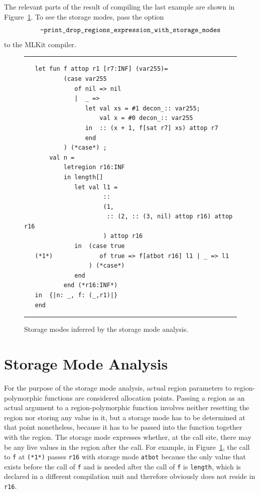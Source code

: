 \documentclass[12pt]{book}
\begin{document}
The relevant parts of the result of compiling the last example are
shown in Figure~\ref{sma1.fig}.  To see the storage modes, pass the option
%
$$\hbox{\tt -print\_drop\_regions\_expression\_with\_storage\_modes}$$
to the MLKit compiler.


\begin{figure}
\hrule 
\medskip
\begin{verbatim}
   let fun f attop r1 [r7:INF] (var255)= 
           (case var255 
              of nil => nil
              |  _ => 
                 let val xs = #1 decon_:: var255; 
                     val x = #0 decon_:: var255
                 in  :: (x + 1, f[sat r7] xs) attop r7
                 end 
           ) (*case*) ; 
       val n = 
           letregion r16:INF 
           in length[] 
              let val l1 = 
                      :: 
                      (1, 
                       :: (2, :: (3, nil) attop r16) attop r16
                      ) attop r16
              in  (case true 
   (*1*)             of true => f[atbot r16] l1 | _ => l1
                  ) (*case*) 
              end  
           end (*r16:INF*)
   in  {|n: _, f: (_,r1)|}
   end 
\end{verbatim}
\caption{Storage modes inferred by the storage mode analysis.}
\label{sma1.fig}
\medskip
\hrule
\end{figure}

\section{Storage Mode Analysis}
\label{sma.sec}
For the purpose of the storage mode analysis, actual region parameters
to region-polymorphic functions are considered allocation points.
Passing a region as an actual argument to a region-polymorphic
function involves neither resetting the region nor storing any value
in it, but a storage mode has to be determined at that point
nonetheless, because it has to be passed into the function together
with the region. The storage mode expresses whether, at the call site,
there may be any live values in the region after the call. For
example, in Figure~\ref{sma1.fig}, the call to {\tt f} at {\tt (*1*)}
passes {\tt r16} with storage mode {\tt atbot} because the only value
that exists before the call of {\tt f} and is needed after the call of
{\tt f} is {\tt length}, which is declared in a different compilation
unit and therefore obviously does not reside in {\tt r16}.
\end{document}
